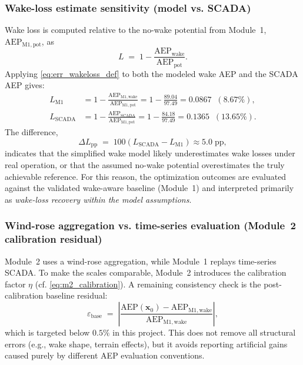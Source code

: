 \documentclass[lettersize,journal]{IEEEtran}
\begin{document}
\subsubsection{Wake-loss estimate sensitivity (model vs. SCADA)}
Wake loss is computed relative to the no-wake potential from Module~1, $\mathrm{AEP}_{\mathrm{M1,pot}}$, as
\begin{equation}
L \;=\; 1 - \frac{\mathrm{AEP}_{\mathrm{wake}}}{\mathrm{AEP}_{\mathrm{pot}}}.
\label{eq:err_wakeloss_def}
\end{equation}
Applying \eqref{eq:err_wakeloss_def} to both the modeled wake AEP and the SCADA AEP gives:
\begin{align}
L_{\mathrm{M1}} &= 1 - \frac{\mathrm{AEP}_{\mathrm{M1,wake}}}{\mathrm{AEP}_{\mathrm{M1,pot}}}
= 1 - \frac{89.04}{97.49} = 0.0867 \;\; (8.67\%), \label{eq:err_wakeloss_model}\\
L_{\mathrm{SCADA}} &= 1 - \frac{\mathrm{AEP}_{\mathrm{SCADA}}}{\mathrm{AEP}_{\mathrm{M1,pot}}}
= 1 - \frac{84.18}{97.49} = 0.1365 \;\; (13.65\%). \label{eq:err_wakeloss_scada}
\end{align}
The difference,
\begin{equation}
\Delta L_{\mathrm{pp}} \;=\; 100\left(L_{\mathrm{SCADA}}-L_{\mathrm{M1}}\right) \approx 5.0 \;\text{pp},
\label{eq:err_wakeloss_gap}
\end{equation}
indicates that the simplified wake model likely underestimates wake losses under real operation, or that the assumed no-wake potential overestimates the truly achievable reference. For this reason, the optimization outcomes are evaluated against the validated wake-aware baseline (Module~1) and interpreted primarily as \emph{wake-loss recovery within the model assumptions}.

\subsubsection{Wind-rose aggregation vs. time-series evaluation (Module~2 calibration residual)}
Module~2 uses a wind-rose aggregation, while Module~1 replays time-series SCADA. To make the scales comparable, Module~2 introduces the calibration factor $\eta$ (cf. \eqref{eq:m2_calibration}). A remaining consistency check is the post-calibration baseline residual:
\begin{equation}
\varepsilon_{\mathrm{base}} \;=\;
\left|
\frac{\mathrm{AEP}(\mathbf{x}_0)-\mathrm{AEP}_{\mathrm{M1,wake}}}{\mathrm{AEP}_{\mathrm{M1,wake}}}
\right|,
\label{eq:err_baseline_residual}
\end{equation}
which is targeted below $0.5\%$ in this project. This does not remove all structural errors (e.g., wake shape, terrain effects), but it avoids reporting artificial gains caused purely by different AEP evaluation conventions.
\end{document}
